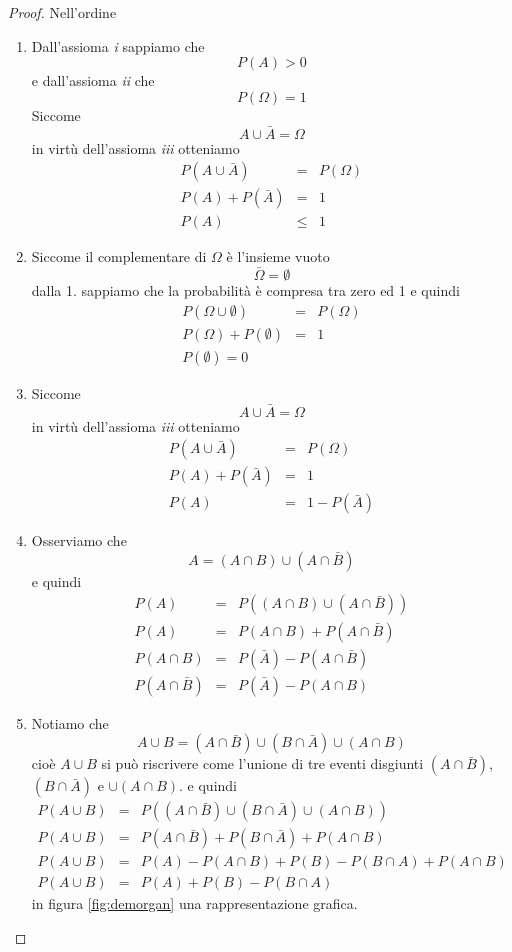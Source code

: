 \documentclass[
  11pt,
]{book}
\theoremstyle{mytheoremstyle}
\theoremstyle{mydefstyle}
\begin{document}
\begin{proof}

Nell'ordine

\begin{enumerate}
\def\labelenumi{\arabic{enumi}.}
\item
  Dall'assioma \emph{i} sappiamo che \[P(A)>0\] e dall'assioma \emph{ii} che
  \[P(\Omega)=1\] Siccome \[A\cup\bar A=\Omega\] in virtù dell'assioma
  \emph{iii} otteniamo \begin{eqnarray*}
  P(A\cup\bar A)&=&  P(\Omega)\\
  P(A)+P(\bar A)&=& 1\\
  P(A)&\le& 1
  \end{eqnarray*}
\item
  Siccome il complementare di \(\Omega\) è l'insieme vuoto \[
  \bar\Omega=\emptyset
  \] dalla 1. sappiamo che la probabilità è compresa tra zero ed 1 e
  quindi \begin{eqnarray*}
  P(\Omega\cup\emptyset)&=&  P(\Omega)\\
  P(\Omega)+P(\emptyset)&=& 1\\
  P(\emptyset)= 0
  \end{eqnarray*}
\item
  Siccome \[A\cup\bar A=\Omega\] in virtù dell'assioma \emph{iii} otteniamo
  \begin{eqnarray*}
  P(A\cup\bar A)&=&  P(\Omega)\\
  P(A)+P(\bar A)&=& 1\\
  P(A)&=& 1-P(\bar A)
  \end{eqnarray*}
\item
  Osserviamo che \[A=(A\cap B)\cup(A\cap\bar B)\] e quindi
  \begin{eqnarray*}
  P(A)&=&  P((A\cap B)\cup(A\cap\bar B))\\
  P(A)&=&  P(A\cap B)+P(A\cap\bar B)\\
  P(A\cap B)&=& P(\bar A)-P(A\cap\bar B)\\
  P(A\cap\bar B)&=& P(\bar A)-P(A\cap B)   
  \end{eqnarray*}
\item
  Notiamo che \[A\cup B=(A\cap\bar B)\cup(B\cap\bar A)\cup(A\cap B)\]
  cioè \(A\cup B\) si può riscrivere come l'unione di tre eventi
  disgiunti \((A\cap\bar B)\), \((B\cap\bar A)\) e \(\cup(A\cap B)\). e
  quindi \begin{eqnarray*}
  P(A\cup B)&=&P((A\cap\bar B)\cup(B\cap\bar A)\cup(A\cap B))\\
  P(A\cup B)&=&P(A\cap\bar B)+P(B\cap\bar A)+P(A\cap B)\\
  P(A\cup B)&=&P(A)-P(A\cap B)+P(B)-P(B\cap A)+P(A\cap B)\\
  P(A\cup B)&=&P(A)+P(B)-P(B\cap A)
  \end{eqnarray*} in figura \ref{fig:demorgan} una rappresentazione
  grafica.
\end{enumerate}

\end{proof}
\end{document}
